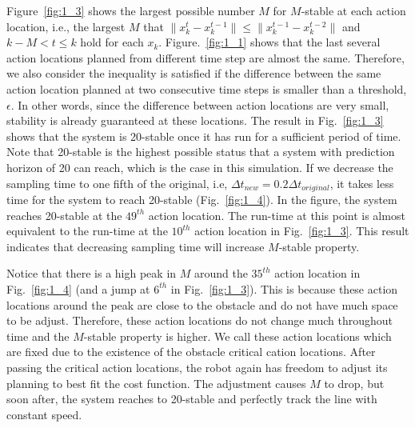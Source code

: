 \documentclass{ifacconf}
\begin{document}




Figure~\ref{fig:1_3} shows the largest possible number $M$ for $M$-stable at each action location, i.e., the largest $M$ that  $\|x_{k}^t-x_k^{t-1}\|\leq \|x_k^{t-1}-x_k^{t-2}\|$ and $k-M< t\leq k$ hold for each $x_k$. Figure.~\ref{fig:1_1} shows that the last several action locations planned from different time step are almost the same. Therefore, we also consider the inequality is satisfied if the difference between the same action location planned at two consecutive time steps is smaller than a threshold, $\epsilon$. In other words, since the difference between action locations are very small, stability is already guaranteed at these locations. The result in Fig.~\ref{fig:1_3} shows that the system is 20-stable once it has run for a sufficient period of time. Note that 20-stable is the highest possible status that a system with prediction horizon of 20 can reach, which is the case in this simulation. If we decrease the sampling time to one fifth of the original, i.e, $\Delta t_{new}=0.2\Delta t_{original}$, it takes less time for the system to reach 20-stable (Fig.~\ref{fig:1_4}). In the figure, the system reaches 20-stable at the $49^{th}$ action location. The run-time at this point is almost equivalent to the run-time at the $10^{th}$ action location in Fig.~\ref{fig:1_3}. This result indicates that decreasing sampling time will increase $M$-stable property.

Notice that there is a high peak in $M$ around the $35^{th}$ action location in Fig.~\ref{fig:1_4} (and a jump at $6^{th}$ in Fig.~\ref{fig:1_3}). This is because these action locations around the peak are close to the obstacle and do not have much space to be adjust. Therefore, these action locations do not change much throughout time and the $M$-stable property is higher. We call these action locations which are fixed due to the existence of the obstacle critical cation locations. After passing the critical action locations, the robot again has freedom to adjust its planning to best fit the cost function. The adjustment causes $M$ to drop, but soon after, the system reaches to 20-stable and perfectly track the line with constant speed. 
\end{document}
